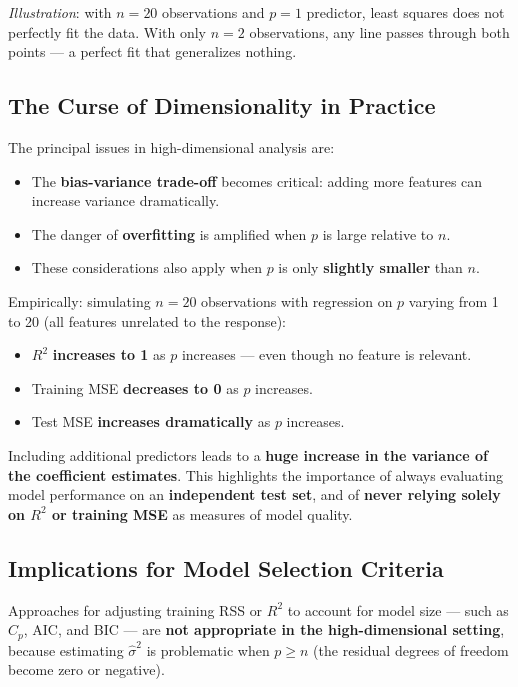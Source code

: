 \documentclass[11pt,a4paper]{article}
\theoremstyle{definition}
\theoremstyle{plain}
\theoremstyle{remark}
\begin{document}
\textit{Illustration}: with $n = 20$ observations and $p = 1$ predictor, least squares does not perfectly fit the data. With only $n = 2$ observations, any line passes through both points — a perfect fit that generalizes nothing.

\subsection{The Curse of Dimensionality in Practice}

The principal issues in high-dimensional analysis are:
\begin{itemize}
    \item The \textbf{bias-variance trade-off} becomes critical: adding more features can increase variance dramatically.
    \item The danger of \textbf{overfitting} is amplified when $p$ is large relative to $n$.
    \item These considerations also apply when $p$ is only \textbf{slightly smaller} than $n$.
\end{itemize}

Empirically: simulating $n = 20$ observations with regression on $p$ varying from 1 to 20 (all features unrelated to the response):
\begin{itemize}
    \item $R^2$ \textbf{increases to 1} as $p$ increases — even though no feature is relevant.
    \item Training MSE \textbf{decreases to 0} as $p$ increases.
    \item Test MSE \textbf{increases dramatically} as $p$ increases.
\end{itemize}

Including additional predictors leads to a \textbf{huge increase in the variance of the coefficient estimates}. This highlights the importance of always evaluating model performance on an \textbf{independent test set}, and of \textbf{never relying solely on $R^2$ or training MSE} as measures of model quality.

\subsection{Implications for Model Selection Criteria}

Approaches for adjusting training RSS or $R^2$ to account for model size — such as $C_p$, AIC, and BIC — are \textbf{not appropriate in the high-dimensional setting}, because estimating $\hat{\sigma}^2$ is problematic when $p \geq n$ (the residual degrees of freedom become zero or negative).
\end{document}
